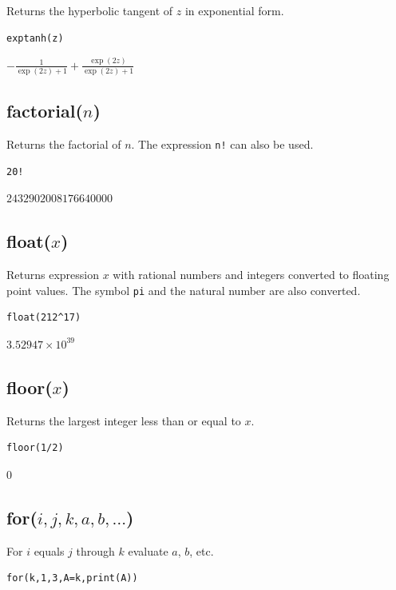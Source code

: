 \documentclass[12pt]{article}
\begin{document}
Returns the hyperbolic tangent of $z$ in exponential form.

{\color{blue}
\begin{verbatim}
exptanh(z)
\end{verbatim}
}

\noindent
$\displaystyle -\frac{1}{\exp(2z)+1}+\frac{\exp(2z)}{\exp(2z)+1}$

\subsection*{factorial($n$)}

Returns the factorial of $n$.
The expression {\tt n!} can also be used.

{\color{blue}
\begin{verbatim}
20!
\end{verbatim}
}

\noindent
$2432902008176640000$

\subsection*{float($x$)}

Returns expression $x$ with rational numbers and integers converted to
floating point values.
The symbol {\tt pi} and the natural number are also converted.

{\color{blue}
\begin{verbatim}
float(212^17)
\end{verbatim}
}

\noindent
$\displaystyle 3.52947\times 10^{39}$

\subsection*{floor($x$)}

Returns the largest integer less than or equal to $x$.

{\color{blue}
\begin{verbatim}
floor(1/2)
\end{verbatim}
}

\noindent
$0$

\subsection*{for($i,j,k,a,b,\ldots$)}

For $i$ equals $j$ through $k$ evaluate $a$, $b$, etc.

{\color{blue}
\begin{verbatim}
for(k,1,3,A=k,print(A))
\end{verbatim}
}
\end{document}
